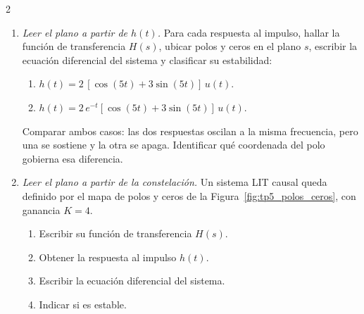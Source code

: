 \documentclass[10pt,a4paper]{article}
\begin{document}
\begin{multicols}{2}
\begin{enumerate}
			\item \emph{Leer el plano a partir de $h(t)$.} Para cada respuesta al impulso, hallar la función de transferencia $H(s)$, ubicar polos y ceros en el plano $s$, escribir la ecuación diferencial del sistema y clasificar su estabilidad:
			\begin{enumerate}
				\item $h(t) = 2\,[\cos(5t) + 3\sin(5t)]\,u(t)$.
				\item $h(t) = 2\,e^{-t}[\cos(5t) + 3\sin(5t)]\,u(t)$.
			\end{enumerate}
			Comparar ambos casos: las dos respuestas oscilan a la misma frecuencia, pero una se sostiene y la otra se apaga. Identificar qué coordenada del polo gobierna esa diferencia.

			\item \emph{Leer el plano a partir de la constelación.} Un sistema LIT causal queda definido por el mapa de polos y ceros de la Figura~\ref{fig:tp5_polos_ceros}, con ganancia $K = 4$.
			\begin{enumerate}
				\item Escribir su función de transferencia $H(s)$.
				\item Obtener la respuesta al impulso $h(t)$.
				\item Escribir la ecuación diferencial del sistema.
				\item Indicar si es estable.
			\end{enumerate}

			\begin{center}
				
				\label{fig:tp5_polos_ceros}
			\end{center}


\end{enumerate}
\end{multicols}
\end{document}
